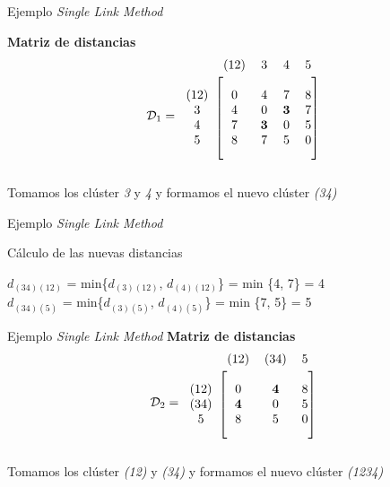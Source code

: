 \documentclass[spanish]{beamer}
\begin{document}
\begin{frame}{Ejemplo \textit{Single Link Method}}

	\textbf{Matriz de distancias}
	\[ \mathcal{D}_1  =
	\begin{blockarray}{ccccc}
		& (12) & 3 & 4 & 5 \\
		\begin{block}{c[cccc]}
			\\
			(12) & 0 & 4 & 7 & 8 \\
			3 & 4 & 0 & \textbf{3} & 7 \\
			4 & 7 & \textbf{3} & 0 & 5 \\
			5 & 8 & 7 & 5 & 0 \\
			\\
		\end{block}
	\end{blockarray}  
	\]
	Tomamos los clúster \textit{3} y \textit{4} y formamos el nuevo clúster \textit{(34)}
\end{frame}

\begin{frame}{Ejemplo \textit{Single Link Method}}

	Cálculo de las nuevas distancias\\
	\begin{center}
		$d_{(34)(12)}$ = min\{$d_{(3)(12)}$, $d_{(4)(12)}$\} = min \{4, 7\} = 4\\
		$d_{(34)(5)}$ = min\{$d_{(3)(5)}$, $d_{(4)(5)}$\} = min \{7, 5\} = 5\\
	\end{center}
\end{frame}

\begin{frame}{Ejemplo \textit{Single Link Method}}
	\textbf{Matriz de distancias}
	\[ \mathcal{D}_2  =
	\begin{blockarray}{cccc}
		& (12) & (34) & 5 \\
		\begin{block}{c[ccc]}
			\\
			(12) & 0 & \textbf{4} & 8 \\
			(34) & \textbf{4} & 0 & 5 \\
			5 & 8 & 5 & 0 \\
			\\
		\end{block}
	\end{blockarray}  
	\] 
	Tomamos los clúster \textit{(12)} y \textit{(34)} y formamos el nuevo clúster \textit{(1234)}
\end{frame}
\end{document}
